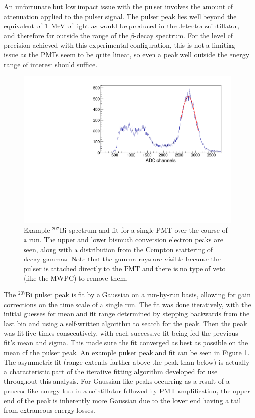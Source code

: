 An unfortunate but low impact issue with the pulser involves the amount of attenuation applied to the
pulser signal. The pulser peak lies well beyond the equivalent of 1~MeV of light as would be produced
in the detector scintillator, and therefore far outside the range of the $\beta$-decay spectrum.
For the level of precision achieved with this experimental configuration, this
is not a limiting issue as the PMTs seem to be quite linear, so even a peak well outside the
energy range of interest should suffice.

\begin{figure}[h] 
\centering
\includegraphics[scale=.60]{3-UCNAAnalysis/gain_bismuth2.pdf}
\caption{Example $^{207}\mathrm{Bi}$ spectrum and fit for a single PMT over
  the course of a run. The upper and lower bismuth conversion electron peaks are
  seen, along with a distribution from the Compton scattering of decay gammas. Note that the gamma rays are
  visible because the pulser is attached directly to the PMT and there is no type
  of veto (like the MWPC) to remove them.}
\label{fig:biPulser}
\end{figure}

The $^{207}\mathrm{Bi}$ pulser peak is fit by a Gaussian on a run-by-run basis, allowing for gain corrections on the time
scale of a single run. The fit was done iteratively, with the initial guesses for mean and fit range determined
by stepping backwards from the last bin and using a self-written algorithm to search for the peak. Then the peak
was fit five times consecutively, with each successive fit being fed the previous fit's mean and sigma. This
made sure the fit converged as best as possible on the mean of the pulser peak. An example pulser peak and fit
can be seen in Figure \ref{fig:biPulser}. The asymmetric fit (range extends farther above the peak than below)
is actually a characteristic part of the iterative
fitting algorithm developed for use throughout this analysis. For Gaussian like peaks occurring as a result of
a process like energy loss in a scintillator followed by PMT amplification, the upper end of the peak is
inherently more Gaussian due to the lower end having a tail from extraneous energy losses. 

